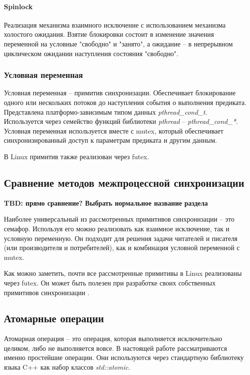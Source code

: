 \paragraph{Spinlock}
Реализация механизма взаимного исключение с использованием механизма холостого ожидания. Взятие блокировки состоит в изменение значения переменной на условные "свободно" и "занято", а ожидание -- в непрерывном циклическом ожидании наступления состояния "свободно".

\subsubsection{Условная переменная}

Условная переменная -- примитив синхронизации. Обеспечивает блокирование одного или нескольких потоков до наступления события о выполнения предиката. Представлена платформо-зависимым типом данных \textit{pthread\_cond\_t}. Используется через семейство функций библиотеки \textit{pthread} -- \textit{pthread\_cond\_*}. Условная переменная используется вместе с mutex, который обеспечивает синхронизированный доступ к параметрам предиката и другим данным.

В Linux примитив также реализован через futex.

\subsection{Сравнение методов межпроцессной синхронизации}

\textbf{TBD: прямо сравнение? Выбрать нормальное название раздела}

Наиболее универсальный из рассмотренных примитивов синхронизации -- это семафор. Используя его можно реализовать как взаимное исключение, так и условную переменную. Он подходит для решения задачи читателей и писателя (или производителя и потребителей), как и комбинация условной переменной с mutex.

Как можно заметить, почти все рассмотренные примитивы в Linux реализованы через futex. Он может быть полезен при разработке своих собственных примитивов синхронизации \cite{FutexesAreTricky}.

\subsection{Атомарные операции}

Атомарная операция -- это операция, которая выполняется исключительно целиком, либо не выполняется вовсе. В настоящей работе рассматриваются именно простейшие операции. Они используются через стандартную библиотеку языка C++ как набор классов \textit{std::atomic}.

